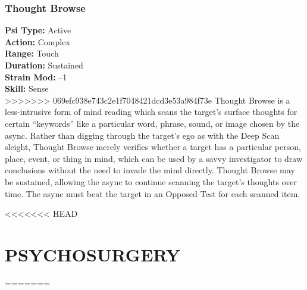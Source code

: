 \subsubsection{Thought Browse}
\textbf{Psi Type:} Active \\ 
\textbf{Action:} Complex \\ 
\textbf{Range:} Touch \\ 
\textbf{Duration:} Sustained \\
\textbf{Strain Mod:} –1 \\ 
\textbf{Skill:} Sense\\
>>>>>>> 069efc938e743c2e1f7048421dcd3e53a984f73e
Thought Browse is a less-intrusive form of mind
reading which scans the target’s surface thoughts for
certain “keywords” like a particular word, phrase,
sound, or image chosen by the async. Rather than digging
through the target’s ego as with the Deep Scan
sleight, Thought Browse merely verifies whether a
target has a particular person, place, event, or thing
in mind, which can be used by a savvy investigator to
draw conclusions without the need to invade the mind
directly. Thought Browse may be sustained, allowing
the async to continue scanning the target’s thoughts
over time. The async must beat the target in an Opposed
Test for each scanned item.

<<<<<<< HEAD
\section{PSYCHOSURGERY}
=======
